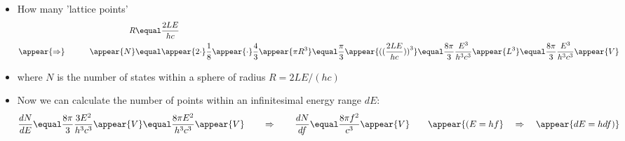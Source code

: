 \begin{frame}
\frametitle{\texorpdfstring{\culine[\sectiontitleulinecolor]{\sectiontitle}}{\sectiontitle} }

\begin{itemize}
	\item How many 'lattice points' 
\[
\begin{aligned}
& & R& \equal \frac{2 L E}{h c} \\ 
&\appear{\Rightarrow} \qquad& \appear{N} &\equal \appear{2 \cdot} \frac{1}{8} \appear{\cdot} \frac{4}{3} \appear{\pi R^{3}}  \equal  \frac{\pi}{3} \appear{\textrm{((} \frac{2 L E}{h c} \textrm{))} ^{3}}  
\equal  \frac{8 \pi}{3} \frac{E^{3}}{h^{3} c^{3}} \appear{L^{3}}  
\equal \frac{8 \pi}{3} \frac{E^{3}}{h^{3} c^{3}} \appear{V}
\end{aligned}
\]

\item[] where $N$ is the number of states within a sphere of radius $R=2 L E /(h c)$ 

\item Now we can calculate the number of points within an infinitesimal energy range $d E$:
\[
\frac{d N}{d E}  \equal \frac{8 \pi}{3} \frac{3 E^{2}}{h^{3} c^{3}} \appear{V}
 \equal \frac{8 \pi E^{2}}{h^{3} c^{3}} \appear{V} 
 \qquad \Rightarrow \qquad 
 \frac{d N}{d f}  \equal \frac{8 \pi f^{2}}{c^{3}} \appear{V} \qquad \appear{(E=h f} \quad \Rightarrow \quad \appear{d E=h d f)}
\]

\end{itemize}

\endofslide 
\end{frame}

